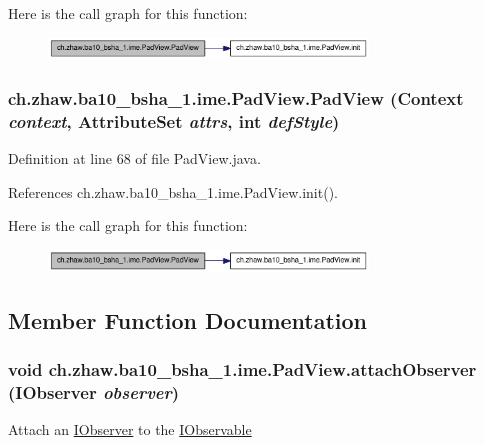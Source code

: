 Here is the call graph for this function:\nopagebreak
\begin{figure}[H]
\begin{center}
\leavevmode
\includegraphics[width=241pt]{classch_1_1zhaw_1_1ba10__bsha__1_1_1ime_1_1PadView_a08835b6a562f4b6dcab131be32589200_cgraph}
\end{center}
\end{figure}
\hypertarget{classch_1_1zhaw_1_1ba10__bsha__1_1_1ime_1_1PadView_a6cf8fbcde7920542f7b36c6a3c5028a9}{
\subsubsection[{PadView}]{\setlength{\rightskip}{0pt plus 5cm}ch.zhaw.ba10\_\-bsha\_\-1.ime.PadView.PadView (Context {\em context}, \/  AttributeSet {\em attrs}, \/  int {\em defStyle})}}
\label{classch_1_1zhaw_1_1ba10__bsha__1_1_1ime_1_1PadView_a6cf8fbcde7920542f7b36c6a3c5028a9}


Definition at line 68 of file PadView.java.

References ch.zhaw.ba10\_\-bsha\_\-1.ime.PadView.init().

Here is the call graph for this function:\nopagebreak
\begin{figure}[H]
\begin{center}
\leavevmode
\includegraphics[width=241pt]{classch_1_1zhaw_1_1ba10__bsha__1_1_1ime_1_1PadView_a6cf8fbcde7920542f7b36c6a3c5028a9_cgraph}
\end{center}
\end{figure}


\subsection{Member Function Documentation}
\hypertarget{classch_1_1zhaw_1_1ba10__bsha__1_1_1ime_1_1PadView_a4969dbd30351775211919860ef1f8643}{
\subsubsection[{attachObserver}]{\setlength{\rightskip}{0pt plus 5cm}void ch.zhaw.ba10\_\-bsha\_\-1.ime.PadView.attachObserver ({\bf IObserver} {\em observer})}}
\label{classch_1_1zhaw_1_1ba10__bsha__1_1_1ime_1_1PadView_a4969dbd30351775211919860ef1f8643}
Attach an \hyperlink{interfacech_1_1zhaw_1_1ba10__bsha__1_1_1ime_1_1IObserver}{IObserver} to the \hyperlink{interfacech_1_1zhaw_1_1ba10__bsha__1_1_1ime_1_1IObservable}{IObservable} 

